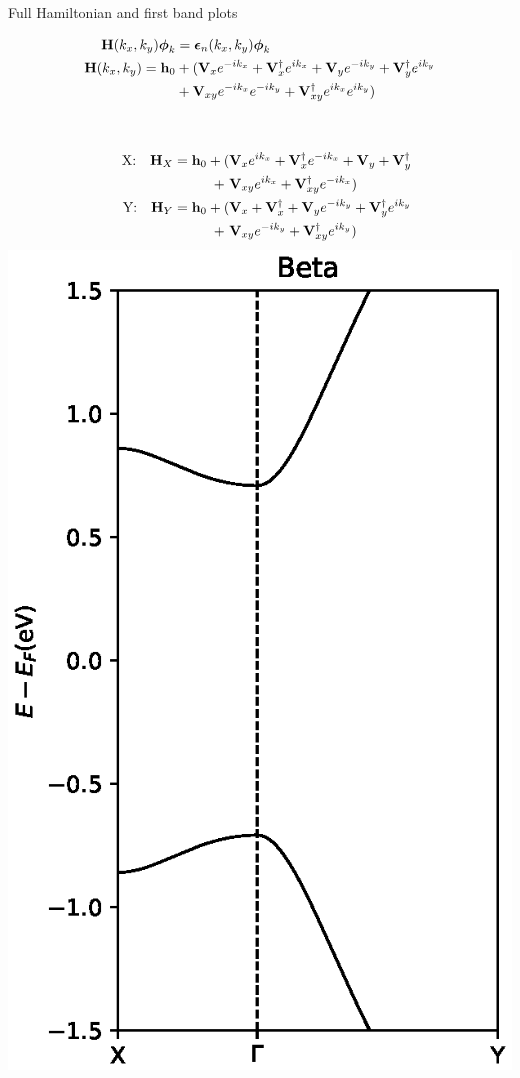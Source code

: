 \documentclass[hyperref={colorlinks=true,urlcolor=blue,linkcolor=.},aspectratio=1610,mathserif]{beamer}
\newcommand{\im}[3]{\inputminted[linenos=true, python3=true, firstline=#2, lastline=#3]{python}{#1}}
\begin{document}
\begin{frame}{Full Hamiltonian and first band plots}
	\begin{overprint}
		\begin{align}
			\vb{H}(k_x,k_y) \vb*{\phi}_k & = \vb*{\epsilon}_n\pqty{k_x,k_y}\vb*{\phi}_k\nonumber                                                               \\
			\vb{H}(k_x,k_y) = \vb{h}_0   & + (\vb{V}_{x}e^{-ik_x} + \vb{V}_{x}^{\dagger}e^{ik_x} + \vb{V}_{y}e^{-ik_y} + \vb{V}_{y}^{\dagger}e^{ik_y}\nonumber \\
			                             & + \vb{V}_{xy}e^{-ik_x}e^{-ik_y} + \vb{V}_{xy}^{\dagger}e^{ik_x}e^{ik_y})\nonumber
		\end{align}
		\im{Listings/Functions.py}{73}{80}
		\begin{columns}[c]
			\begin{align}
				\qq{X:} \vb{H}_{X} = \vb{h}_0 + ( & \vb{V}_{x}e^{ik_x} + \vb{V}_{x}^{\dagger}e^{-ik_x} + \vb{V}_{y} + \vb{V}_{y}^{\dagger}\nonumber \\
				+\                                & \vb{V}_{xy}e^{ik_x} + \vb{V}_{xy}^{\dagger}e^{-ik_x}) \nonumber                                 \\
				\qq{Y:} \vb{H}_{Y} = \vb{h}_0 + ( & \vb{V}_{x} + \vb{V}_{x}^{\dagger} + \vb{V}_{y}e^{-ik_y} + \vb{V}_{y}^{\dagger}e^{ik_y}\nonumber \\
				+\                                & \vb{V}_{xy}e^{-ik_y} + \vb{V}_{xy}^{\dagger}e^{ik_y}) \nonumber
			\end{align}
			\includegraphics[width=.4\textwidth]{Figures/BetaBandstructures.eps}
		\end{columns}
	\end{overprint}
\end{frame}
\end{document}

